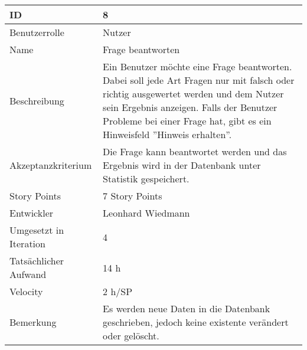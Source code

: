 \begin{tabularx}{\textwidth}{|p{}|X|}
	\hline
	ID & 8\\
	\hline
	Benutzerrolle & Nutzer\\
	\hline
	Name & Frage beantworten\\
	\hline
	Beschreibung & Ein Benutzer möchte eine Frage beantworten. Dabei soll jede Art Fragen nur mit falsch oder richtig ausgewertet werden und dem Nutzer sein Ergebnis anzeigen. Falls der Benutzer Probleme bei einer Frage hat, gibt es ein Hinweisfeld ''Hinweis erhalten''.\\
	\hline
	Akzeptanzkriterium & Die Frage kann beantwortet werden und das Ergebnis wird in der Datenbank unter Statistik gespeichert.\\
	\hline
	Story Points & 7 Story Points\\
	\hline
	Entwickler & Leonhard Wiedmann\\
	\hline
	Umgesetzt in Iteration & 4\\
	\hline
	Tatsächlicher Aufwand & 14 h\\
	\hline
	Velocity & 2 h/SP\\
	\hline
	Bemerkung & Es werden neue Daten in die Datenbank geschrieben, jedoch keine existente verändert oder gelöscht.\\
	\hline
\end{tabularx}
\vspace{20pt}
